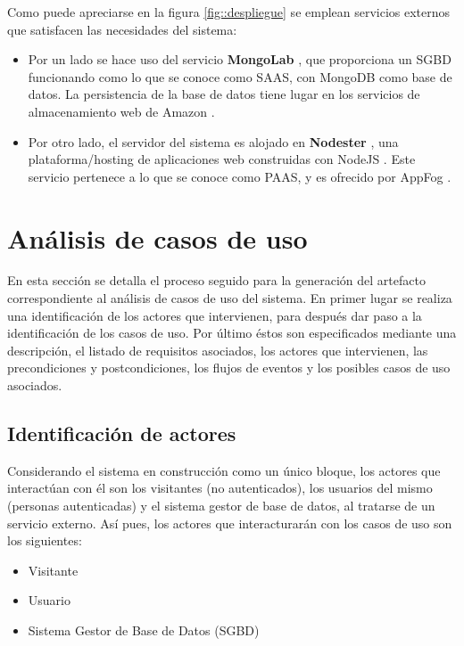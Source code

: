 Como puede apreciarse en la figura \ref{fig::despliegue} se emplean servicios externos que satisfacen las necesidades del sistema:

\begin{itemize}
\item Por un lado se hace uso del servicio {\bf MongoLab} \cite{Mongolab}, que proporciona un \ac{SGBD} funcionando como lo que se conoce como \ac{SAAS}, con MongoDB \cite{MongoDB} como base de datos. La persistencia de la base de datos tiene lugar en los servicios de almacenamiento web de Amazon \cite{Amazon}.
\item Por otro lado, el servidor del sistema es alojado en {\bf Nodester} \cite{Nodester}, una plataforma/hosting de aplicaciones web construidas con NodeJS \cite{NodeJS}. Este servicio pertenece a lo que se conoce como \ac{PAAS}, y es ofrecido por AppFog \cite{AppFog}.
\end{itemize}


\section{Análisis de casos de uso}
\label{sec::casos}

En esta sección se detalla el proceso seguido para la generación del artefacto correspondiente al análisis de casos de uso del sistema. En primer lugar se realiza una identificación de los actores que intervienen, para después dar paso a la identificación de los casos de uso. Por último éstos son especificados mediante una descripción, el listado de requisitos asociados, los actores que intervienen, las precondiciones y postcondiciones, los flujos de eventos y los posibles casos de uso asociados.

\subsection{Identificación  de actores}

Considerando el sistema en construcción como un único bloque, los actores que interactúan con él son los visitantes (no autenticados), los usuarios del mismo (personas autenticadas) y el sistema gestor de base de datos, al tratarse de un servicio externo. Así pues, los actores que interacturarán con los casos de uso son los siguientes:

\begin{itemize}
\item Visitante
\item Usuario
\item Sistema Gestor de Base de Datos (SGBD)
\end{itemize}

